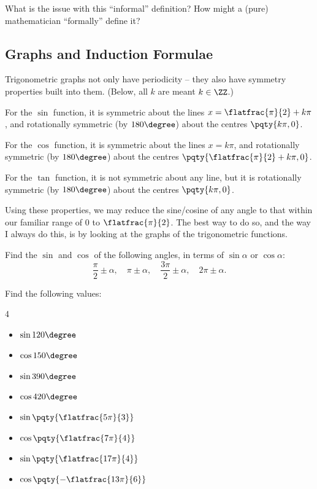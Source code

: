 \documentclass{article}
\begin{document}
\begin{problem}
    What is the issue with this ``informal'' definition? How might a (pure) mathematician ``formally'' define it?
\end{problem}

\subsection{Graphs and Induction Formulae}

Trigonometric graphs not only have periodicity -- they also have symmetry properties built into them. (Below, all \(k\) are meant \(k \in \ZZ\).)

For the \(\sin\) function, it is symmetric about the lines \(x = \flatfrac{\pi}{2} + k \pi\), and rotationally symmetric (by \(180\degree\)) about the centres \(\pqty{k \pi, 0}\).

For the \(\cos\) function, it is symmetric about the lines \(x = k \pi\), and rotationally symmetric (by \(180\degree\)) about the centres \(\pqty{\flatfrac{\pi}{2} + k \pi, 0}\).

For the \(\tan\) function, it is not symmetric about any line, but it is rotationally symmetric (by \(180 \degree\)) about the centres \(\pqty{k \pi, 0}\).

Using these properties, we may reduce the sine/cosine of any angle to that within our familiar range of \(0\) to \(\flatfrac{\pi}{2}\). The best way to do so, and the way I always do this, is by looking at the graphs of the trigonometric functions.

\begin{examples}
    Find the \(\sin\) and \(\cos\) of the following angles, in terms of \(\sin \alpha\) or \(\cos \alpha\):
    \[
        \frac{\pi}{2} \pm \alpha, \quad \pi \pm \alpha, \quad \frac{3\pi}{2} \pm \alpha, \quad 2\pi \pm \alpha.
    \]
\end{examples}

\begin{examples}
    Find the following values:
    \begin{multicols}{4}
        \begin{itemize}
            \item \(\sin 120 \degree\)
            \item \(\cos 150 \degree\)
            \item \(\sin 390 \degree\)
            \item \(\cos 420 \degree\)
            \item \(\sin \pqty{\flatfrac{5\pi}{3}}\)
            \item \(\cos \pqty{\flatfrac{7\pi}{4}}\)
            \item \(\sin \pqty{\flatfrac{17\pi}{4}}\)
            \item \(\cos \pqty{- \flatfrac{13\pi}{6}}\)
        \end{itemize}
    \end{multicols}
\end{examples}
\end{document}
